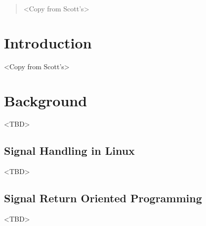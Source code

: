 \documentclass{sig-alternate-05-2015}
\begin{document}
%
\author{
%
%
\alignauthor
Abhiram Balasubramanian\\
       \\
\alignauthor
Scott Bauer\\
       \\
}

\maketitle
\begin{abstract}
<Copy from Scott's>
\end{abstract}

\section{Introduction}
<Copy from Scott's>

\section {Background}
<TBD>
\subsection{Signal Handling in Linux}
<TBD>
\subsection{Signal Return Oriented Programming}
<TBD>
\end{document}
